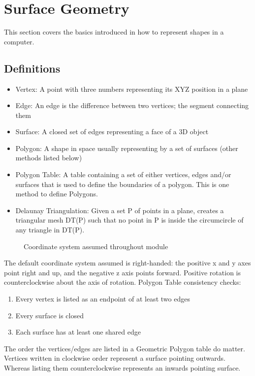 \section{Surface Geometry}
This section covers the basics introduced in how to represent shapes in a computer.
\subsection{Definitions}
\begin{itemize}
	\item Vertex: A point with three numbers representing its XYZ position in a plane
	\item Edge: An edge is the difference between two vertices; the segment connecting them
	\item Surface: A closed set of edges representing a face of a 3D object
	\item Polygon: A shape in space usually representing by a set of surfaces (other methods listed below)
	\item Polygon Table: A table containing a set of either vertices, edges and/or surfaces that is used to define the boundaries of a polygon. This is one method to define Polygons.
	\item Delaunay Triangulation: Given a set P of points in a plane, creates a triangular mesh DT(P) such that no point in P is inside the circumcircle of any triangle in DT(P).
\end{itemize}
   \begin{figure}[!htb]
	\caption{\label{fig:rhcoords} Coordinate system assumed throughout module}
	\end{figure}
The default coordinate system assumed is right-handed: the positive x and y axes point right and up, and the negative z axis points forward. Positive rotation is counterclockwise about the axis of rotation.
\newline
Polygon Table consistency checks:
\begin{enumerate}
	\item Every vertex is listed as an endpoint of at least two edges
	\item Every surface is closed
	\item Each surface has at least one shared edge
\end{enumerate}
The order the vertices/edges are listed in a Geometric Polygon table do matter. Vertices written in clockwise order represent a surface pointing outwards. Whereas listing them counterclockwise represents an inwards pointing surface.

